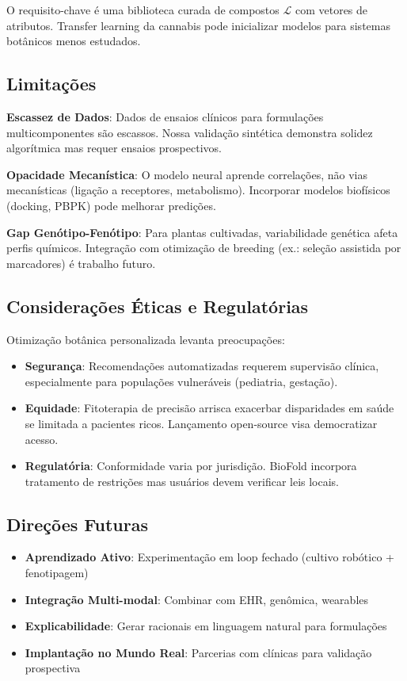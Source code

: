 \documentclass[11pt,a4paper]{article}
\begin{document}
O requisito-chave é uma biblioteca curada de compostos \(\mathcal{L}\) com vetores de atributos. Transfer learning da cannabis pode inicializar modelos para sistemas botânicos menos estudados.

\subsection{Limitações}

\textbf{Escassez de Dados}: Dados de ensaios clínicos para formulações multicomponentes são escassos. Nossa validação sintética demonstra solidez algorítmica mas requer ensaios prospectivos.

\textbf{Opacidade Mecanística}: O modelo neural aprende correlações, não vias mecanísticas (ligação a receptores, metabolismo). Incorporar modelos biofísicos (docking, PBPK) pode melhorar predições.

\textbf{Gap Genótipo-Fenótipo}: Para plantas cultivadas, variabilidade genética afeta perfis químicos. Integração com otimização de breeding (ex.: seleção assistida por marcadores) é trabalho futuro.

\subsection{Considerações Éticas e Regulatórias}

Otimização botânica personalizada levanta preocupações:
\begin{itemize}
    \item \textbf{Segurança}: Recomendações automatizadas requerem supervisão clínica, especialmente para populações vulneráveis (pediatria, gestação).
    \item \textbf{Equidade}: Fitoterapia de precisão arrisca exacerbar disparidades em saúde se limitada a pacientes ricos. Lançamento open-source visa democratizar acesso.
    \item \textbf{Regulatória}: Conformidade varia por jurisdição. BioFold incorpora tratamento de restrições mas usuários devem verificar leis locais.
\end{itemize}

\subsection{Direções Futuras}

\begin{itemize}
    \item \textbf{Aprendizado Ativo}: Experimentação em loop fechado (cultivo robótico + fenotipagem)
    \item \textbf{Integração Multi-modal}: Combinar com EHR, genômica, wearables
    \item \textbf{Explicabilidade}: Gerar racionais em linguagem natural para formulações
    \item \textbf{Implantação no Mundo Real}: Parcerias com clínicas para validação prospectiva
\end{itemize}
\end{document}
